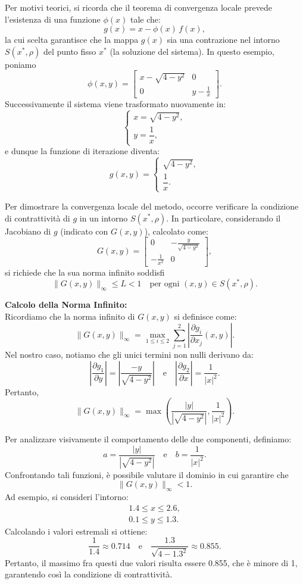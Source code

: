 \documentclass[11pt]{article}
\begin{document}
Per motivi teorici, si ricorda che il teorema di convergenza locale prevede l’esistenza di una funzione \(\phi(x)\) tale che:
\[
g(x) = x - \phi(x)\,f(x),
\]
la cui scelta garantisce che la mappa \(g(x)\) sia una contrazione nel intorno \(S(x^*,\rho)\) del punto fisso \(x^*\) (la soluzione del sistema). In questo esempio, poniamo
\[
\phi(x,y)=
\begin{bmatrix}
	x-\sqrt{4-y^2} & 0 \\
	0 & y-\frac{1}{x}
\end{bmatrix}.
\]
Successivamente il sistema viene trasformato nuovamente in:
\[
\begin{cases}
  x = \sqrt{4 - y^2}, \\
  y = \dfrac{1}{x},
\end{cases}
\]
e dunque la funzione di iterazione diventa:
\[
  g(x,y) = \begin{cases}
    \sqrt{4 - y^2}, \\
    \dfrac{1}{x}.
  \end{cases}
\]

Per dimostrare la convergenza locale del metodo, occorre verificare la condizione di contrattività di \(g\) in un intorno \(S(x^*,\rho)\). In particolare, considerando il Jacobiano di \(g\) (indicato con \(G(x,y)\)), calcolato come:
\[
G(x,y)=
\begin{bmatrix}
0 & \displaystyle -\frac{y}{\sqrt{4-y^2}}\\[1mm]
-\displaystyle\frac{1}{x^2} & 0
\end{bmatrix},
\]
si richiede che la sua norma infinito soddisfi
\[
\|G(x,y)\|_\infty \leq L < 1 \quad \text{per ogni } (x,y)\in S(x^*,\rho).
\]

\vspace{1em}
\textbf{Calcolo della Norma Infinito:}\\  
Ricordiamo che la norma infinito di \(G(x,y)\) si definisce come:
\[
	\|G(x,y)\|_\infty = \max_{1\leq i\leq 2} \sum_{j=1}^2 \left| \frac{\partial g_i}{\partial x_j}(x,y)\right|.
\]
Nel nostro caso, notiamo che gli unici termini non nulli derivano da:
\[
\left|\frac{\partial g_1}{\partial y}\right| = \left|\frac{-y}{\sqrt{4-y^2}}\right| \quad \text{e} \quad \left|\frac{\partial g_2}{\partial x}\right| = \frac{1}{|x|^2}.
\]
Pertanto,
\[
\|G(x,y)\|_\infty= \max \left(\frac{|y|}{\left|\sqrt{4-y^2}\right|}, \frac{1}{|x|^2}\right).
\]

\vspace{1em}
Per analizzare visivamente il comportamento delle due componenti, definiamo:
\[
a=\frac{|y|}{\left|\sqrt{4-y^2}\right|} \quad \text{e} \quad b=\frac{1}{|x|^2}.
\]
\noindent Confrontando tali funzioni, è possibile valutare il dominio in cui garantire che
\[
\|G(x,y)\|_\infty < 1.
\]
Ad esempio, si consideri l’intorno:
\[
\begin{matrix}
1.4\leq x\leq 2.6,\\[0.5em]
0.1 \leq y \leq 1.3.
\end{matrix}
\]
Calcolando i valori estremali si ottiene:
\[
\frac{1}{1.4}\approx 0.714 \quad \text{e} \quad \frac{1.3}{\sqrt{4-1.3^2}}\approx 0.855.
\]
Pertanto, il massimo fra questi due valori risulta essere 0.855, che è minore di 1, garantendo così la condizione di contrattività.
\end{document}
